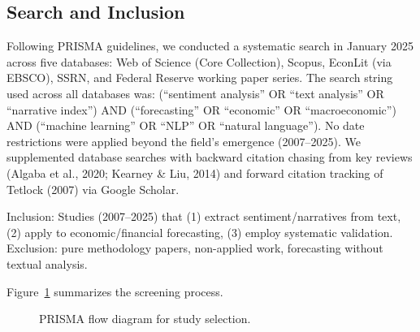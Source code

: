 \documentclass[11pt,twocolumn]{article}
\begin{document}
\subsection{Search and Inclusion}

Following PRISMA guidelines, we conducted a systematic search in January 2025 across five databases: Web of Science (Core Collection), Scopus, EconLit (via EBSCO), SSRN, and Federal Reserve working paper series. The search string used across all databases was: (``sentiment analysis'' OR ``text analysis'' OR ``narrative index'') AND (``forecasting'' OR ``economic'' OR ``macroeconomic'') AND (``machine learning'' OR ``NLP'' OR ``natural language''). No date restrictions were applied beyond the field's emergence (2007--2025). We supplemented database searches with backward citation chasing from key reviews (Algaba et al., 2020; Kearney \& Liu, 2014) and forward citation tracking of Tetlock (2007) via Google Scholar. 

Inclusion: Studies (2007--2025) that (1) extract sentiment/narratives from text, (2) apply to economic/financial forecasting, (3) employ systematic validation. Exclusion: pure methodology papers, non-applied work, forecasting without textual analysis.

Figure~\ref{fig:prisma} summarizes the screening process.

\begin{figure}[t]
\centering
\caption{PRISMA flow diagram for study selection.}
\label{fig:prisma}
\small
{}
\end{figure}
\end{document}
